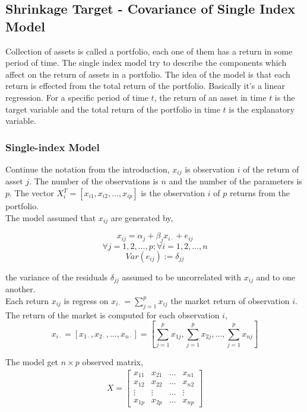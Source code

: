 \documentclass[letterpaper]{article}
\begin{document}
	\subsection{Shrinkage Target - Covariance of Single Index Model}	
	 Collection of assets is called a portfolio, each one of them has a return in some period of time. The single index model try to describe the components which affect on the return of assets in a portfolio. The idea of the model is that each return is effected from the total return of the portfolio. Basically it's a linear regression. For a specific period of time \(t\),  the return of an asset in time \(t\) is the target variable and the total return of the portfolio in time \(t\) is the explanatory variable.\\
	 
	\subsubsection{Single-index Model}
	Continue the notation from the introduction, \(x_{ij}\) is observation \(i\) of the return of asset \(j\). The number of the observations is \(n\) and the number of the parameters is \(p\). The vector \(X_i^T = [x_{i1}, x_{i2}, \dots, x_{ip}]\) is the observation \(i\) of \(p\) returns from the portfolio.\\
	 
	The model assumed that \(x_{ij}\) are generated by, 
	 
	\[x_{ij} = \alpha_{j} + \beta_{j}x_{i\cdot} + e_{ij}\]  
	\[\forall j = 1, 2, ..., p;  \forall i = 1, 2, ..., n\]
	\[Var(e_{ij}) := \delta_{jj}\]
	
	the variance of the residuals \(\delta_{jj}\) assumed to be uncorrelated with \(x_{ij}\) and to one another.\\
	
	Each return \(x_{ij}\) is regress on \(x_{i\cdot} = \sum_{j=1}^{p} x_{ij} \)  the market return of observation \(i\). The return of the market is computed for each observation \(i\), 
	\[x_{i\cdot} = [x_{1\cdot}, x_{2\cdot}, \dots, x_{n\cdot}]  = 
	\left[
	\sum_{j=1}^{p}x_{1j}, \sum_{j=1}^{p}x_{2j}, ..., \sum_{j=1}^{p}x_{nj} 
	\right] \]

	The model get \(n \times p\) observed matrix,
	\begin{align*} 
	X = 
	\begin{bmatrix}
	x_{11} & x_{21} & \dots  & x_{n1}  \\
	x_{12} & x_{22} & \dots  & x_{n2}  \\
	\vdots & \vdots & \dots  & \vdots  \\
	x_{1p} & x_{2p} & \dots  & x_{np}
	\end{bmatrix}
	\end{align*}
	
\end{document}
